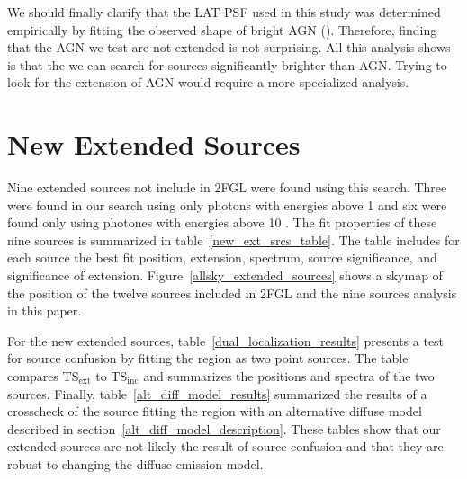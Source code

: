 \documentclass[12pt,preprint]{aastex}
\newcommand{\gev}{\text{GeV}\xspace}
\newcommand{\tsext}{{\ensuremath{\text{TS}_\text{ext}}}\xspace}
\newcommand{\tsinc}{\ensuremath{\text{TS}_\text{inc}}\xspace}
\begin{document}
We should finally clarify that the LAT PSF used in this study was
determined empirically by fitting the observed shape of bright AGN
(\cite{lat_on_orbit_psf}).  Therefore, finding that the AGN we test are
not extended is not surprising.  All this analysis shows is that the we
can search for sources significantly brighter than AGN.  Trying to look
for the extension of AGN would require a more specialized analysis.

\section{New Extended Sources}
\label{new_ext_srcs_section}



Nine extended sources not include in 2FGL were found
using this search.  Three were found in our search using only photons
with energies above 1 \gev and six were found only using photones with
energies above 10 \gev.  The fit properties of these nine sources is
summarized in table~\ref{new_ext_srcs_table}.  The table includes for each
source the best fit position, extension, spectrum, source significance,
and significance of extension.  Figure~\ref{allsky_extended_sources}
shows a skymap of the position of the twelve sources included in 2FGL
and the nine sources analysis in this paper.

For the new extended sources, table~\ref{dual_localization_results}
presents a test for source confusion by fitting the region
as two point sources. The table compares \tsext
to \tsinc and summarizes the positions and spectra of the two sources.
Finally, table~\ref{alt_diff_model_results} summarized the results of
a crosscheck of the source fitting the region with an alternative diffuse
model described in section~\ref{alt_diff_model_description}.  These tables
show that our extended sources are not likely the result of source confusion
and that they are robust to changing the diffuse emission model.
\end{document}
